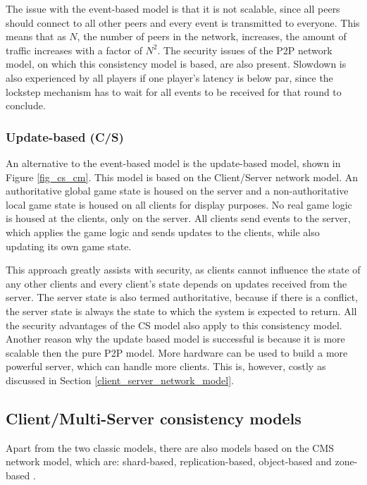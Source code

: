 \documentclass[10pt,a4paper,journal,cspaper,compsoc]{IEEEtran}
\begin{document}
The issue with the event-based model is that it is not scalable, since all peers should connect to all other peers and every event is transmitted to
everyone. This means that as $N$, the number of peers in the network, increases, the amount of traffic increases with a factor of $N^2$. The security
issues of the P2P network model, on which this consistency model is based, are also present. Slowdown is also experienced by all players if one
player's latency is below par, since the lockstep mechanism has to wait for all events to be received for that round to conclude.

\subsubsection{Update-based (C/S)}
An alternative to the event-based model is the update-based model, shown in Figure \ref{fig_cs_cm}. This model is based on the Client/Server network
model. An authoritative global game state is housed on the server and a non-authoritative local game state is housed on all clients for display
purposes. No real game logic is housed at the clients, only on the server. All clients send events to the server, which applies the game logic and
sends updates to the clients, while also updating its own game state.

This approach greatly assists with security, as clients cannot influence the state of any other clients and every client's state depends on updates
received from the server. The server state is also termed authoritative, because if there is a conflict, the server state is always the state to
which the system is expected to return. All the security advantages of the \ac{CS} model also apply to this consistency model. Another reason why the
update based model is successful is because it is more scalable then the pure P2P model. More hardware can be used to build a more powerful server,
which can handle more clients. This is, however, costly as discussed in Section \ref{client_server_network_model}.

\subsection{Client/Multi-Server consistency models}
\label{cms_models}


Apart from the two classic models, there are also models based on the \ac{CMS} network model, which are: shard-based, replication-based, object-based
and zone-based \cite{Hu_voronoi_IM}.
\end{document}

